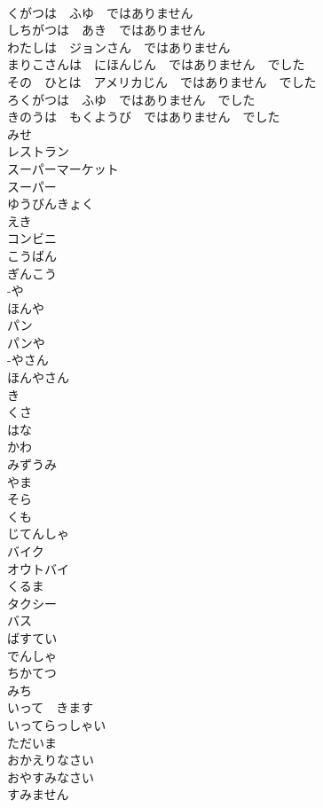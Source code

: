 \documentclass[8pt]{extreport}
\begin{document}
\begin{CJK}{UTF8}{min}
\\	くがつは　ふゆ　ではありません	
\\	しちがつは　あき　ではありません	
\\	わたしは　ジョンさん　ではありません	
\\	まりこさんは　にほんじん　ではありません　でした	
\\	その　ひとは　アメリカじん　ではありません　でした	
\\	ろくがつは　ふゆ　ではありません　でした	
\\	きのうは　もくようび　ではありません　でした	
\\	みせ	
\\	レストラン	
\\	スーパーマーケット	
\\	スーパー	
\\	ゆうびんきょく	
\\	えき	
\\	コンビニ	
\\	こうばん	
\\	ぎんこう	
\\	-や 
\\	ほんや	
\\	パン	
\\	パンや	
\\	-やさん	
\\	ほんやさん	
\\	き	
\\	くさ	
\\	はな 
\\	かわ	
\\	みずうみ	
\\	やま	
\\	そら	
\\	くも	
\\	じてんしゃ	
\\	バイク	
\\	オウトバイ	
\\	くるま	
\\	タクシー	
\\	バス	
\\	ばすてい	
\\	でんしゃ	
\\	ちかてつ	
\\	みち	
\\	いって　きます	
\\	いってらっしゃい	
\\	ただいま	
\\	おかえりなさい	
\\	おやすみなさい	
\\	すみません	

\end{CJK}
\end{document}
